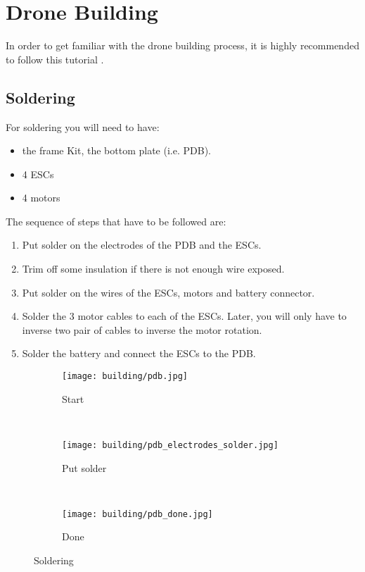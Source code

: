\chapter{Drone Building}
In order to get familiar with the drone building process, it is highly recommended to follow this tutorial \cite{udemy_build_course}.

\section{Soldering}
For soldering you will need to have:
\begin{itemize}
    \item the frame Kit, the bottom plate (i.e. PDB).
    \item 4 ESCs
    \item 4 motors
\end{itemize}
The sequence of steps that have to be followed are:
\begin{enumerate}
    \item Put solder on the electrodes of the PDB and the ESCs.
    \item Trim off some insulation if there is not enough wire exposed.
    \item Put solder on the wires of the ESCs, motors and battery connector.
    \item Solder the 3 motor cables to each of the ESCs. Later, you will only have to inverse two pair of cables to inverse the motor rotation.
    \item Solder the battery and connect the ESCs to the PDB.
\end{enumerate}
\begin{figure}[!ht]
    \centering
    \begin{subfigure}[b]{0.3\textwidth}
        \texttt{[image: building/pdb.jpg]}
        \caption{Start}
        \label{fig:pdb}
    \end{subfigure}
    ~
    \begin{subfigure}[b]{0.3\textwidth}
        \texttt{[image: building/pdb\_electrodes\_solder.jpg]}
        \caption{Put solder}
        \label{fig:pdb_electrodes_solder}
    \end{subfigure}
    ~
    \begin{subfigure}[b]{0.3\textwidth}
        \texttt{[image: building/pdb\_done.jpg]}
        \caption{Done}
        \label{fig:pdb_done}
    \end{subfigure}
    \caption{Soldering}\label{fig:soldering}
\end{figure}


